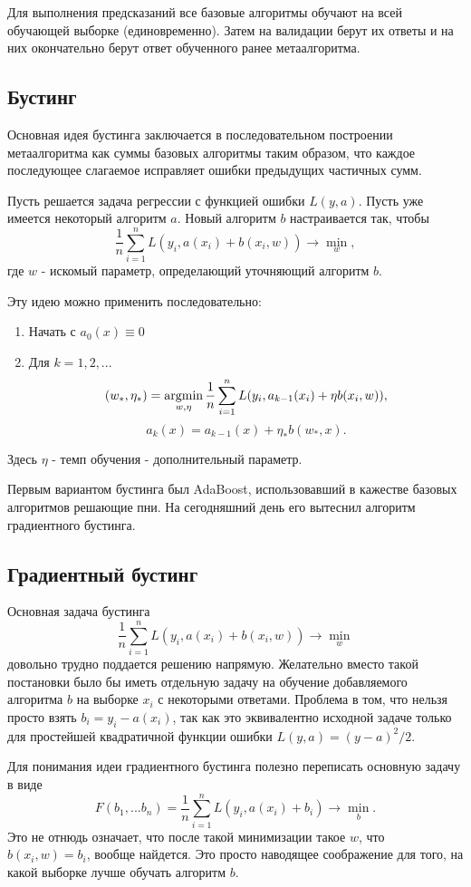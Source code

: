 Для выполнения предсказаний все базовые алгоритмы обучают на всей обучающей выборке (единовременно). Затем на валидации берут их ответы и на них окончательно берут ответ обученного ранее метаалгоритма.  


\subsection{Бустинг}

Основная идея бустинга заключается в последовательном построении метаалгоритма как суммы базовых алгоритмы таким образом, что каждое последующее слагаемое исправляет ошибки предыдущих частичных сумм.

Пусть решается задача регрессии с функцией ошибки $L(y, a)$. Пусть уже имеется некоторый алгоритм $a$. Новый алгоритм $b$ настраивается так, чтобы 
$$
\frac{1}{n}\sum_{i=1}^nL(y_i, a(x_i) + b(x_i, w)) \rightarrow \min_w,
$$
где $w$ - искомый параметр, определающий уточняющий алгоритм $b$.

Эту идею можно применить последовательно:
\begin{enumerate}
    \item Начать с $a_0(x) \equiv 0$ 
    \item Для $k = 1, 2, ...$ 
$$
(w_*, \eta_*) = \operatorname*{argmin}_{w, \eta} \frac{1}{n}\sum_{i=1}^nL(y_i, a_{k-1}(x_i) + \eta b(x_i, w)),
$$
$$
a_k(x) = a_{k-1}(x) + \eta_*b(w_*, x).
$$
\end{enumerate}
Здесь $\eta$ - темп обучения - дополнительный параметр.

Первым вариантом бустинга был AdaBoost, использовавший в кажестве базовых алгоритмов решающие пни. На сегодняшний день его вытеснил алгоритм градиентного бустинга.

\subsection{Градиентный бустинг}

Основная задача бустинга
$$
\frac{1}{n}\sum_{i=1}^nL(y_i, a(x_i) + b(x_i, w)) \rightarrow \min_w
$$
довольно трудно поддается решению напрямую. Желательно вместо такой постановки было бы иметь отдельную задачу на обучение добавляемого алгоритма $b$ на выборке $x_i$ с некоторыми ответами. Проблема в том, что нельзя просто взять $b_i = y_i - a(x_i)$, так как это эквивалентно исходной задаче только для простейшей квадратичной функции ошибки $L(y, a) = (y - a)^2/2$.

Для понимания идеи градиентного бустинга полезно переписать основную задачу в виде
$$
F(b_1, ... b_n) = \frac{1}{n}\sum_{i=1}^nL(y_i, a(x_i) + b_i) \rightarrow \min_b.
$$
Это не отнюдь означает, что после такой минимизации такое $w$, что $b(x_i, w) = b_i$, вообще найдется. Это просто наводящее соображение для того, на какой выборке лучше обучать алгоритм $b$.

